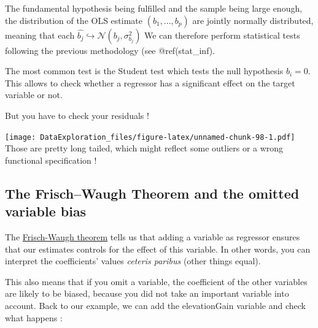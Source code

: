 \documentclass[
]{book}
\newenvironment{Shaded}{\begin{snugshade}}{\end{snugshade}}
\newcommand{\DataTypeTok}[1]{\textcolor[rgb]{0.13,0.29,0.53}{#1}}
\newcommand{\KeywordTok}[1]{\textcolor[rgb]{0.13,0.29,0.53}{\textbf{#1}}}
\newcommand{\NormalTok}[1]{#1}
\newcommand{\OperatorTok}[1]{\textcolor[rgb]{0.81,0.36,0.00}{\textbf{#1}}}
\newcommand{\StringTok}[1]{\textcolor[rgb]{0.31,0.60,0.02}{#1}}
\begin{document}
The fundamental hypothesis being fulfilled and the sample being large enough, the distribution of the OLS estimate \((b_1,...,b_p)\) are jointly normally distributed, meaning that each \(\hat{b_j} \hookrightarrow \mathcal{N}(b_j,\sigma_{b_j}^2)\)
We can therefore perform statistical tests following the previous methodology (see @ref(stat\_inf).

The most common test is the Student test which tests the null hypothesis \(b_i=0\). This allows to check whether a regressor has a significant effect on the target variable or not.

But you have to check your residuals !

\begin{Shaded}
\end{Shaded}

\texttt{[image: DataExploration\_files/figure-latex/unnamed-chunk-98-1.pdf]}
Those are pretty long tailed, which might reflect some outliers or a wrong functional specification !

\hypertarget{the-frischwaugh-theorem-and-the-omitted-variable-bias}{%
\subsection{The Frisch--Waugh Theorem and the omitted variable bias}\label{the-frischwaugh-theorem-and-the-omitted-variable-bias}}

The \href{https://en.wikipedia.org/wiki/Frisch\%E2\%80\%93Waugh\%E2\%80\%93Lovell_theorem}{Frisch-Waugh theorem} tells us that adding a variable as regressor ensures that our estimates controls for the effect of this variable. In other words, you can interpret the coefficients' values \emph{ceteris paribus} (other things equal).

This also means that if you omit a variable, the coefficient of the other variables are likely to be biased, because you did not take an important variable into account. Back to our example, we can add the elevationGain variable and check what happens :
\end{document}
